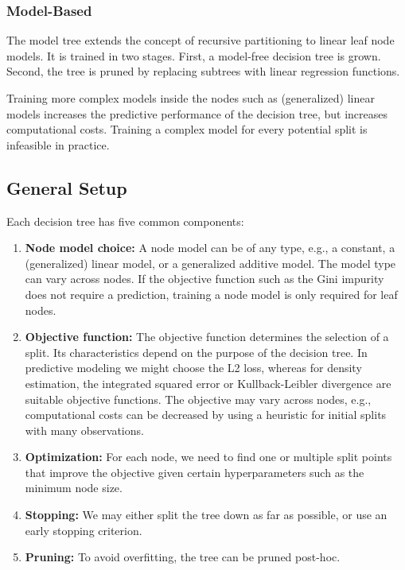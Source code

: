 \documentclass[a4paper, 11pt]{article}
\begin{document}
\subsubsection{Model-Based}

The model tree \cite{quinlan_model_tree} extends the concept of recursive partitioning to linear leaf node models. It is trained in two stages. First, a model-free decision tree is grown. Second, the tree is pruned by replacing subtrees with linear regression functions. 


Training more complex models inside the nodes such as (generalized) linear models increases the predictive performance of the decision tree, but increases computational costs. Training a complex model for every potential split is infeasible in practice. 




\subsection{General Setup}

Each decision tree has five common components:
\begin{enumerate}
    \item \textbf{Node model choice:} A node model can be of any type, e.g., a constant, a (generalized) linear model, or a generalized additive model. The model type can vary across nodes. If the objective function such as the Gini impurity does not require a prediction, training a node model is only required for leaf nodes.
    \item \textbf{Objective function:} 
    The objective function determines the selection of a split. Its characteristics depend on the purpose of the decision tree. In predictive modeling we might choose the L2 loss, whereas for density estimation, the integrated squared error or Kullback-Leibler divergence are suitable objective functions. The objective may vary across nodes, e.g., computational costs can be decreased by using a heuristic for initial splits with many observations. 
    \item \textbf{Optimization:} For each node, we need to find one or multiple split points that improve the objective given certain hyperparameters such as the minimum node size.
    \item \textbf{Stopping:} We may either split the tree down as far as possible, or use an early stopping criterion.
    \item \textbf{Pruning:} To avoid overfitting, the tree can be pruned post-hoc.
\end{enumerate}
\end{document}
